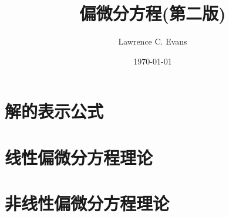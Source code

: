 \documentclass[lang=cn,newtx,10pt,scheme=Chinese,citestyle=numeric,bibstyle=numeric]{../../Template/elegantbook}
\title{偏微分方程(第二版)}
\author{Lawrence C. Evans}
\institute{无}
\date{\today}
\begin{document}

\maketitle

\frontmatter

\tableofcontents%

\mainmatter%





\part{解的表示公式}





\part{线性偏微分方程理论}





\part{非线性偏微分方程理论}









\appendix









\nocite{*}%
\printbibliography[heading=bibintoc, title=\ebibname]

\end{document}
